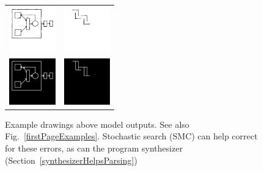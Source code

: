 \documentclass{article}
\begin{document}
\begin{figure}[H]
\begin{minipage}[t]{8.25cm}
\begin{tabular}{llll}
      \end{tabular}
  \end{minipage}
\hfill  \begin{minipage}[t]{4.25cm}
    \begin{tabular}{ll}
          \includegraphics[width = 2cm]{figures/expert-1.png}&
          \includegraphics[width = 2cm]{figures/expert-34.png}\\
      \includegraphics[width = 2cm]{figures/expert-1-parse.png}     &
              \includegraphics[width = 2cm]{figures/34-parse.png}    
    \end{tabular}


  \end{minipage}


  \caption{Example drawings above model outputs. See also Fig.~\ref{firstPageExamples}. Stochastic search (SMC) can help correct for these errors, as can the program synthesizer (Section~\ref{synthesizerHelpsParsing})}\label{lotsOfHandDrawings}
\end{figure}
\setlength\tabcolsep{6pt}
\end{document}

